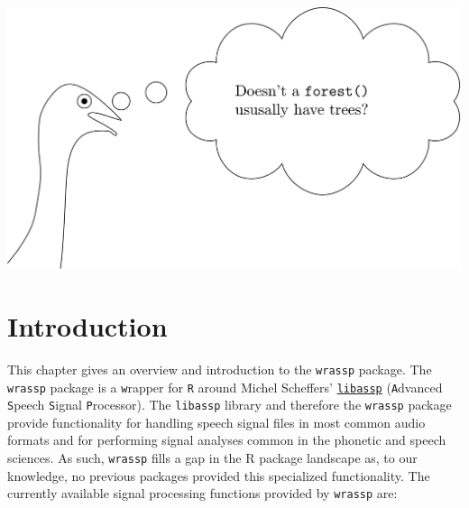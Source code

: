 \documentclass[]{book}
\begin{document}
\begin{center}\includegraphics[width=0.75\linewidth]{pics/EMU-webAppEmu_wrassp} \end{center}

\hypertarget{introduction}{%
\section{Introduction}\label{introduction}}

This chapter gives an overview and introduction to the \texttt{wrassp} package. The \texttt{wrassp} package is a \texttt{w}rapper for \texttt{R} around Michel Scheffers' \href{http://libassp.sourceforge.net/}{\texttt{libassp}} (\texttt{A}dvanced \texttt{S}peech \texttt{S}ignal \texttt{P}rocessor). The \texttt{libassp} library and therefore the \texttt{wrassp} package provide functionality for handling speech signal files in most common audio formats and for performing signal analyses common in the phonetic and speech sciences. As such, \texttt{wrassp} fills a gap in the R package landscape as, to our knowledge, no previous packages provided this specialized functionality. The currently available signal processing functions provided by \texttt{wrassp} are:
\end{document}
